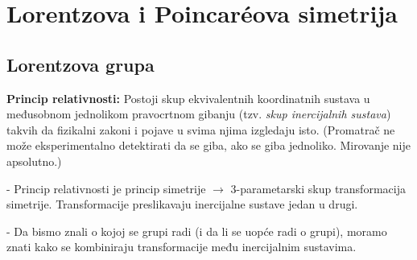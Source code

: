 
\chapter{Lorentzova i Poincar\'{e}ova simetrija}

\section{Lorentzova grupa}
\label{sec:lorentz}

\textbf{Princip relativnosti:} Postoji skup ekvivalentnih koordinatnih
sustava u međusobnom jednolikom pravocrtnom gibanju (tzv. \emph{skup
inercijalnih sustava}) takvih da fizikalni zakoni i pojave u svima njima
izgledaju isto. (Promatrač ne može eksperimentalno detektirati da 
se giba, ako se giba jednoliko. Mirovanje nije apsolutno.)


- Princip relativnosti je princip simetrije $\to$ 3-parametarski skup
transformacija simetrije. Transformacije preslikavaju inercijalne
sustave jedan u drugi.

- Da bismo znali o kojoj se grupi radi (i da li se uopće radi o grupi),
moramo znati kako se kombiniraju transformacije među inercijalnim sustavima.

